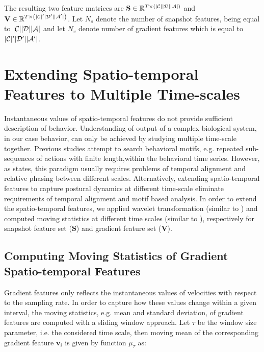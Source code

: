 The resulting two feature matrices are $\mathbf{S} \in \mathbb{R}^{T \times \left(\lvert\mathcal{C}\rvert\lvert\mathcal{D}\rvert\lvert\mathcal{A}\rvert\right)}$ and $\mathbf{V} \in \mathbb{R}^{T \times \left(\lvert\mathcal{C}\rvert^{\prime}\lvert\mathcal{D}^{\prime}\rvert\lvert\mathcal{A}^{\prime}\rvert\right)}$. Let $N_s$ denote the number of snapshot features, being equal to $\lvert\mathcal{C}\rvert\lvert\mathcal{D}\rvert\lvert\mathcal{A}\rvert$ and let $N_v$ denote number of gradient features which is equal to $\lvert\mathcal{C}\rvert^{\prime}\lvert\mathcal{D}^{\prime}\rvert\lvert\mathcal{A}^{\prime}\rvert$.

\section{Extending Spatio-temporal Features to Multiple Time-scales}\label{section:extending-features-to-multiple-time-scale}
Instantaneous values of spatio-temporal features do not provide sufficient description of behavior.
Understanding of output of a complex biological system, in our case behavior, can only be achieved by studying multiple time-scale together.
Previous studies attempt to search behavioral motifs, e.g. repeated sub-sequences of actions with finite length,within the behavioral time series.
However, as \citet{berman_mapping_2014} states, this paradigm usually requires problems of temporal alignment and relative phasing between different scales.
Alternatively, extending spatio-temporal features to capture postural dynamics at different time-scale eliminate requirements of temporal alignment and motif based analysis.
In order to extend the spatio-temporal features, we applied wavelet transformation (similar to \citet{berman_mapping_2014}) and computed moving statistics at different time scales (similar to \citet{kabra_jaaba_2013}), respectively for snapshot feature set ($\mathbf{S}$) and gradient feature set ($\mathbf{V}$).

\subsection{Computing Moving Statistics of Gradient Spatio-temporal Features}
Gradient features only reflects the instantaneous values of velocities with respect to the sampling rate. In order to capture how these values change within a given interval, the moving statistics, e.g. mean and standard deviation, of gradient features are computed with a sliding window approach. Let $\tau$ be the window size parameter, i.e. the considered time scale, then moving mean of the corresponding gradient feature $\mathbf{v}_{i}$ is given by function $\mu_\tau$ as:

